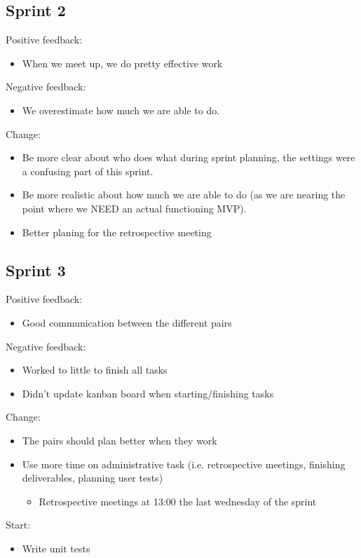 \documentclass[a4paper,12pt]{article}
\begin{document}
 \subsection{Sprint 2}
 Positive feedback:
 \begin{itemize}
 	\item When we meet up, we do pretty effective work
 \end{itemize}
 Negative feedback:
 \begin{itemize}
 	\item We overestimate how much we are able to do.
 \end{itemize}
 Change:
 \begin{itemize}
 	\item Be more clear about who does what during sprint planning, the settings were a confusing part of this sprint.
 	\item Be more realistic about how much we are able to do (as we are nearing the point where we NEED an actual functioning MVP).
 	\item Better planing for the retrospective meeting\
 \end{itemize}
 
 \subsection{Sprint 3}
 Positive feedback:
 \begin{itemize}
 	\item Good communication between the different pairs
 \end{itemize}
 Negative feedback:
 \begin{itemize}
 	\item Worked to little to finish all tasks
 	\item Didn't update kanban board when starting/finishing tasks
 \end{itemize}
 Change:
 \begin{itemize}
 	\item The pairs should plan better when they work
 	\item Use more time on administrative task (i.e. retrospective meetings, finishing deliverables, planning user tests)
 	\begin{itemize}
 		\item Retrospective meetings at 13:00 the last wednesday of the sprint
 	\end{itemize}
 \end{itemize}
 Start:
 \begin{itemize}
 	\item Write unit tests
 \end{itemize}
 
\end{document}
